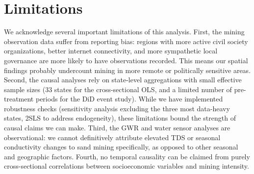 \documentclass[12pt]{article}
\begin{document}
\section*{Limitations}

We acknowledge several important limitations of this analysis. First, the mining observation data suffer from reporting bias: regions with more active civil society organizations, better internet connectivity, and more sympathetic local governance are more likely to have observations recorded. This means our spatial findings probably undercount mining in more remote or politically sensitive areas. Second, the causal analyses rely on state-level aggregations with small effective sample sizes (33 states for the cross-sectional OLS, and a limited number of pre-treatment periods for the DiD event study). While we have implemented robustness checks (sensitivity analysis excluding the three most data-heavy states, 2SLS to address endogeneity), these limitations bound the strength of causal claims we can make. Third, the GWR and water sensor analyses are observational: we cannot definitively attribute elevated TDS or seasonal conductivity changes to sand mining specifically, as opposed to other seasonal and geographic factors. Fourth, no temporal causality can be claimed from purely cross-sectional correlations between socioeconomic variables and mining intensity.
\end{document}
